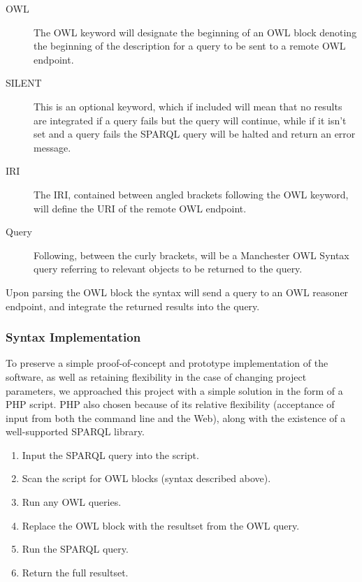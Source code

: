 \documentclass{article}
\begin{document}
\begin{description}
    \item[OWL] The OWL keyword will designate the beginning of an OWL block
    denoting the beginning of the description for a query to be sent to a remote
    OWL endpoint.
    \item[SILENT] This is an optional keyword, which if included will mean that
    no results are integrated if a query fails but the query will continue,
    while if it isn't set and a query fails the SPARQL query will be halted and
    return an error message.
    \item[IRI] The IRI, contained between angled brackets following the OWL
    keyword, will define the URI of the remote OWL endpoint.
    \item[Query] Following, between the curly brackets, will be a Manchester OWL
    Syntax query referring to relevant objects to be returned to the query.
\end{description}

Upon parsing the OWL block the syntax will send a query to an OWL reasoner
endpoint, and integrate the returned results into the query. 

\subsubsection{Syntax Implementation}

To preserve a simple proof-of-concept and prototype implementation of the
software, as well as retaining flexibility in the case of changing project
parameters, we approached this project with a simple solution in the form of a
PHP script. PHP also chosen because of its relative flexibility (acceptance of
input from both the command line and the Web), along with the existence of a
well-supported SPARQL library.

\begin{enumerate}
    \item Input the SPARQL query into the script.
    \item Scan the script for OWL blocks (syntax described above).
    \item Run any OWL queries.
    \item Replace the OWL block with the resultset from the OWL query.
    \item Run the SPARQL query.
    \item Return the full resultset.
\end{enumerate}
\end{document}
